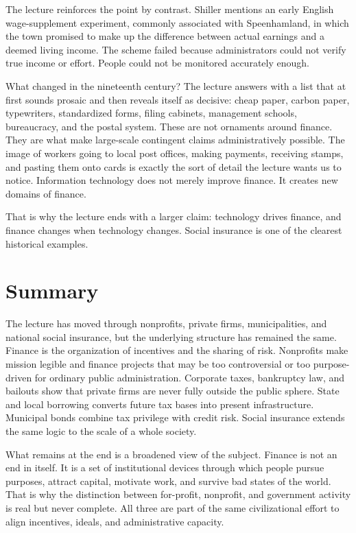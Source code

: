 The lecture reinforces the point by contrast. Shiller mentions an early English wage-supplement experiment, commonly associated with Speenhamland, in which the town promised to make up the difference between actual earnings and a deemed living income. The scheme failed because administrators could not verify true income or effort. People could not be monitored accurately enough.

What changed in the nineteenth century? The lecture answers with a list that at first sounds prosaic and then reveals itself as decisive: cheap paper, carbon paper, typewriters, standardized forms, filing cabinets, management schools, bureaucracy, and the postal system. These are not ornaments around finance. They are what make large-scale contingent claims administratively possible. The image of workers going to local post offices, making payments, receiving stamps, and pasting them onto cards is exactly the sort of detail the lecture wants us to notice. Information technology does not merely improve finance. It creates new domains of finance.

That is why the lecture ends with a larger claim: technology drives finance, and finance changes when technology changes. Social insurance is one of the clearest historical examples.

\section{Summary}

The lecture has moved through nonprofits, private firms, municipalities, and national social insurance, but the underlying structure has remained the same. Finance is the organization of incentives and the sharing of risk. Nonprofits make mission legible and finance projects that may be too controversial or too purpose-driven for ordinary public administration. Corporate taxes, bankruptcy law, and bailouts show that private firms are never fully outside the public sphere. State and local borrowing converts future tax bases into present infrastructure. Municipal bonds combine tax privilege with credit risk. Social insurance extends the same logic to the scale of a whole society.

What remains at the end is a broadened view of the subject. Finance is not an end in itself. It is a set of institutional devices through which people pursue purposes, attract capital, motivate work, and survive bad states of the world. That is why the distinction between for-profit, nonprofit, and government activity is real but never complete. All three are part of the same civilizational effort to align incentives, ideals, and administrative capacity.
